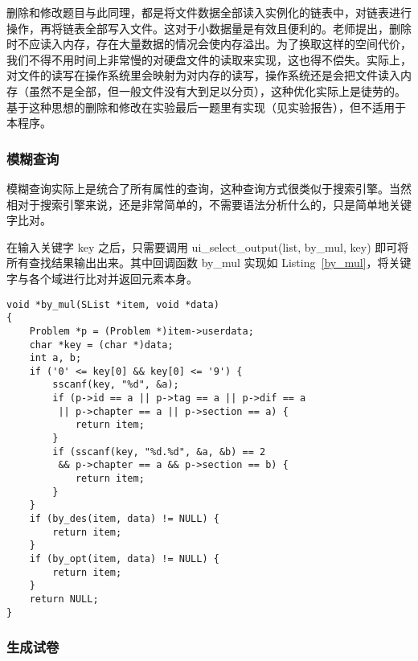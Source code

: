 删除和修改题目与此同理，都是将文件数据全部读入实例化的链表中，对链表进行操作，再将链表全部写入文件。这对于小数据量是有效且便利的。老师提出，删除时不应读入内存，存在大量数据的情况会使内存溢出。为了换取这样的空间代价，我们不得不用时间上非常慢的对硬盘文件的读取来实现，这也得不偿失。实际上，对文件的读写在操作系统里会映射为对内存的读写，操作系统还是会把文件读入内存（虽然不是全部，但一般文件没有大到足以分页），这种优化实际上是徒劳的。基于这种思想的删除和修改在实验最后一题里有实现（见实验报告），但不适用于本程序。

\subsubsection{模糊查询}

模糊查询实际上是统合了所有属性的查询，这种查询方式很类似于搜索引擎。当然相对于搜索引擎来说，还是非常简单的，不需要语法分析什么的，只是简单地关键字比对。

在输入关键字 key 之后，只需要调用 ui\_select\_output(list, by\_mul, key) 即可将所有查找结果输出出来。其中回调函数 by\_mul 实现如 Listing~\ref{by_mul}，将关键字与各个域进行比对并返回元素本身。



{\linespread{1}
\begin{lstlisting}[caption={\label{by_mul}by\_mul()}]
void *by_mul(SList *item, void *data)
{
    Problem *p = (Problem *)item->userdata;
    char *key = (char *)data;
    int a, b;
    if ('0' <= key[0] && key[0] <= '9') {
        sscanf(key, "%d", &a);
        if (p->id == a || p->tag == a || p->dif == a
         || p->chapter == a || p->section == a) {
            return item;
        }
        if (sscanf(key, "%d.%d", &a, &b) == 2
         && p->chapter == a && p->section == b) {
            return item;
        }
    }
    if (by_des(item, data) != NULL) {
        return item;
    }
    if (by_opt(item, data) != NULL) {
        return item;
    }
    return NULL;
}
\end{lstlisting}
}

\subsubsection{生成试卷}

